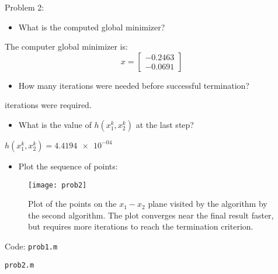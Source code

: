 \documentclass{article}
\begin{document}
\newpage
\noindent
{\large Problem 2:}
\begin{itemize}
	\item What is the computed global minimizer?
\end{itemize}
\qquad \qquad The computer global minimizer is:
\begin{equation*}
	x = \begin{bmatrix} -0.2463 \\ -0.0691 \end{bmatrix}
\end{equation*}
\begin{itemize}
	\item How many iterations were needed before successful termination?
\end{itemize}
\qquad {} iterations were required. 
\begin{itemize}
	\item What is the value of $h(x_1^k, x_2^k)$ at the last step?
\end{itemize}
\qquad \qquad $h(x_1^k, x_2^k) = \num{4.4194e-04}$
\begin{itemize}
	\item Plot the sequence of points:
\end{itemize}
\begin{figure}[H]
	\centering
	\texttt{[image: prob2]}
	\caption{Plot of the points on the $x_1 - x_2$ plane visited by the algorithm by the second algorithm. The plot converges near the final result faster, but requires more iterations to reach the termination criterion.}
\end{figure}

\newpage
\noindent
{\huge Code:} \newline
\texttt{prob1.m}

\newpage
\noindent
\texttt{prob2.m}

\end{document}
